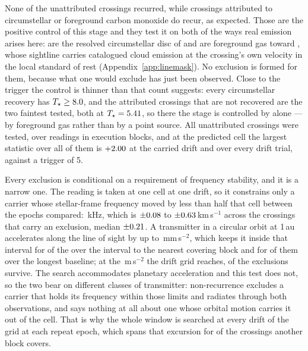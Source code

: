 None of the unattributed crossings recurred, while \MkAttrRecur{} crossings
attributed to circumstellar or foreground carbon monoxide do recur, as
expected. Those \MkAttrRecur{} are the positive control of this stage and they
test it on both of the ways real emission arises here: \RqNRecurDisc{} are the
resolved circumstellar disc of \RqRecurDiscStars{} and \RqNRecurCloud{} are
foreground gas toward \RqRecurCloudStars, whose sightline carries catalogued
cloud emission at the crossing's own velocity in the local standard of rest
(Appendix~\ref{app:linemask}). No exclusion is formed for them, because what
one would exclude has just been observed. Close to the trigger the control is
thinner than that count suggests: every circumstellar recovery has
$T_\star\ge8.0$, and the \RqNearTrigN{} attributed crossings that
are not recovered are the two faintest tested, both at
$T_\star=5.41$, so there the stage is controlled by
\RqRecurCloudStars{} alone --- by foreground gas rather than by a point
source. All \RcNTested{} unattributed crossings were tested, over
\RcNRepeatMeas{} readings in \RcNRepeatBlock{} execution blocks, and at the
predicted cell the largest statistic over all of them is $+2.00$ at the
carried drift and \RcTMax{} over every drift trial, against a trigger of 5.

Every exclusion is conditional on a requirement of frequency stability, and it
is a narrow one. The reading is taken at one cell at one drift, so it
constrains only a carrier whose stellar-frame frequency moved by less than
half that cell between the epochs compared: \TjChanKHz\,kHz, which is
$\pm0.08$ to $\pm0.63$\,km\,s$^{-1}$ across the \RqNUnit{} crossings
that carry an exclusion, median $\pm0.21$. A transmitter in a circular
orbit at 1\,au accelerates along the line of sight by up to
\RqOrbAu\,mm\,s$^{-2}$, which keeps it inside that interval for \RqNOrbNear{}
of the \RqNUnit{} over the interval to the nearest covering block and for
\RqNOrbFar{} of them over the longest baseline; at the \WdAGrid\,m\,s$^{-2}$
the drift grid reaches, \RqOrbGridWord{} of the exclusions survive. The search
accommodates planetary acceleration and this test does not, so the two bear on
different classes of transmitter: non-recurrence excludes a carrier that holds
its frequency within those limits and radiates through both observations, and
says nothing at all about one whose orbital motion carries it out of the cell.
That is why the whole window is searched at every drift of the grid at each
repeat epoch, which spans that excursion for \WdNOrbSpan{} of the
\WdNOrbTot{} crossings another block covers.

